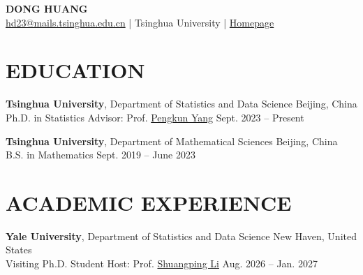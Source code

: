 \documentclass[a4paper,10pt]{extarticle}
\begin{document}
\begin{center}
  {\Large\textbf{DONG HUANG}}\\[3pt]
  \href{mailto:hd23@mails.tsinghua.edu.cn}{hd23@mails.tsinghua.edu.cn}
  \;|\; Tsinghua University
  \;|\; \href{https://donghuang-stat.github.io/}{Homepage}
\end{center}

\section*{EDUCATION}

\textbf{Tsinghua University}, Department of Statistics and Data Science
\hfill Beijing, China\\
Ph.D. in Statistics \quad Advisor: Prof. \href{https://www.stat.tsinghua.edu.cn/info/1023/4126.htm}{Pengkun Yang}
\hfill Sept. 2023 -- Present

\medskip
\textbf{Tsinghua University}, Department of Mathematical Sciences
\hfill Beijing, China\\
B.S. in Mathematics
\hfill Sept. 2019 -- June 2023

\section*{ACADEMIC EXPERIENCE}

\textbf{Yale University}, Department of Statistics and Data Science
\hfill New Haven, United States\\
Visiting Ph.D. Student \quad Host: Prof. \href{https://fifalsp.github.io/}{Shuangping Li}
\hfill Aug. 2026 -- Jan. 2027
\end{document}
